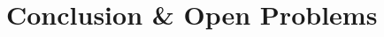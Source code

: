 \chapter[Conclusion \&~Open Problems]{Conclusion \& Open Problems}
\label{ch:conclu-database}
\renewcommand\thefigure{\thechapter.\arabic{figure}}

